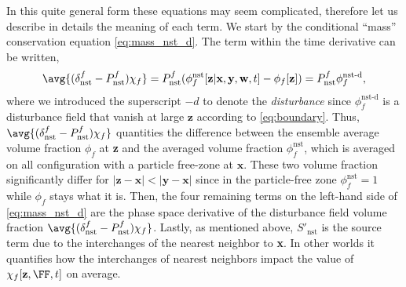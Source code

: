 In this quite general form these equations may seem complicated, therefore let us describe in details the meaning of each term. 
We start by the conditional ``mass'' conservation equation \eqref{eq:mass_nst_d}. 
The term within the time derivative can be written,  
\begin{equation}
    \avg{(\delta_\text{nst}^f - P_\text{nst}^f )\chi_f}
    = P_\text{nst}^f(
        \phi_f^\text{nst}[\textbf{z}|\textbf{x},\textbf{y},\textbf{w},t]
        - \phi_f[\textbf{z}]
    )
    = P_\text{nst}^f \phi_f^\text{nst-d},
\end{equation}
where we introduced the superscript $-d$ to denote the \textit{disturbance} since $\phi_f^\text{nst-d}$ is a disturbance field that vanish at large $\textbf{z}$ according to \ref{eq:boundary}. 
Thus, $\avg{(\delta_\text{nst}^f - P_\text{nst}^f)\chi_f}$ quantities the difference between the ensemble average volume fraction $\phi_f$ at \textbf{z} and the averaged volume fraction $\phi_f^\text{nst}$, which is averaged on all configuration with a particle free-zone at $\textbf{x}$.
These two volume fraction significantly differ for $|\textbf{z} - \textbf{x}| <|\textbf{y} - \textbf{x}|$ since in the particle-free zone $\phi_f^\text{nst} = 1$ while $\phi_f$ stays what it is. 
Then, the four remaining terms on the left-hand side of \ref{eq:mass_nst_d} are the phase space derivative of the disturbance field volume fraction $\avg{(\delta_\text{nst}^f - P_\text{nst}^f)\chi_f}$.
Lastly, as mentioned above, $S'_\text{nst}$ is the source term due to the interchanges of the nearest neighbor to \textbf{x}. 
In other worlds it quantifies how the interchanges of nearest neighbors impact the value of $\chi_f[\textbf{z},\FF,t]$ on average. 

